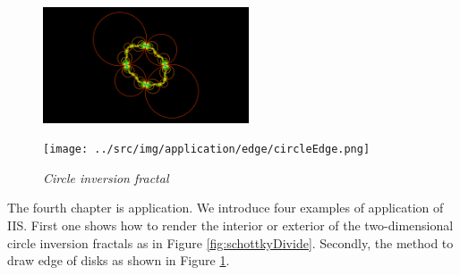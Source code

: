 \documentclass[uplatex, dvipdfmx]{article}
\begin{document}
\begin{figure}[htbp]
 \begin{minipage}[t]{0.5\hsize}
  \center
  \includegraphics[height=1.35in, keepaspectratio]{../src/img/application/edge/circles.png}
  \subcaption{\textit{}}
  \label{}
  \hspace*{\fill}
 \end{minipage}
 \begin{minipage}[t]{0.5\hsize}
  \center
  \texttt{[image: ../src/img/application/edge/circleEdge.png]}
  \subcaption{\textit{}}
  \label{}
  \hspace*{\fill}
 \end{minipage}
 \caption{\textit{Circle inversion fractal}}
 \label{fig:circleEdge}
\end{figure}

The fourth chapter is application.
We introduce four examples of application of IIS.
First one shows how to render the interior or exterior of the
two-dimensional circle inversion fractals as in Figure \ref{fig:schottkyDivide}.
Secondly, the method to draw edge of disks as shown in
Figure \ref{fig:circleEdge}.
\end{document}
